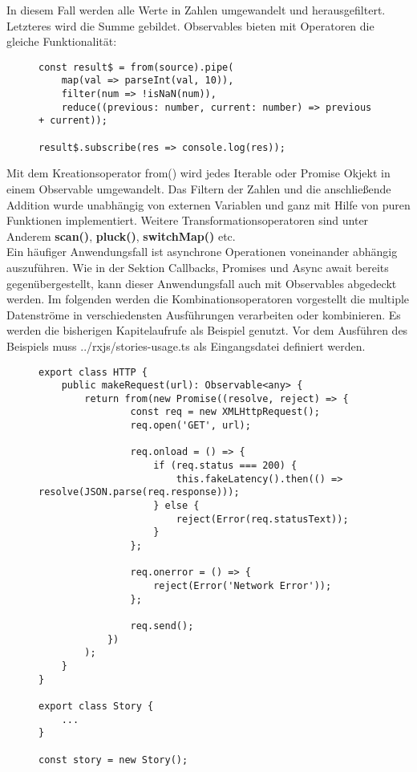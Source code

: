 \noindent
In diesem Fall werden alle Werte in Zahlen umgewandelt und herausgefiltert. Letzteres wird die Summe gebildet. Observables bieten mit Operatoren die gleiche Funktionalität:

\begin{figure}[H]
\begin{lstlisting}[basicstyle=\small]
const result$ = from(source).pipe(
    map(val => parseInt(val, 10)),
    filter(num => !isNaN(num)),
    reduce((previous: number, current: number) => previous + current));

result$.subscribe(res => console.log(res));
\end{lstlisting}
\end{figure}

\noindent
Mit dem Kreationsoperator from() wird jedes Iterable oder Promise Okjekt in einem Observable umgewandelt. Das Filtern der Zahlen und die anschließende Addition wurde unabhängig von externen Variablen und ganz mit Hilfe von puren Funktionen implementiert. Weitere Transformationsoperatoren sind unter Anderem \textbf{scan()}, \textbf{pluck()}, \textbf{switchMap()} etc.\\

\noindent
Ein häufiger Anwendungsfall ist asynchrone Operationen voneinander abhängig auszuführen. Wie in der Sektion Callbacks, Promises und Async await bereits gegenübergestellt, kann dieser Anwendungsfall auch mit Observables abgedeckt werden. Im folgenden werden die Kombinationsoperatoren vorgestellt die multiple Datenströme in verschiedensten Ausführungen verarbeiten oder kombinieren. Es werden die bisherigen Kapitelaufrufe als Beispiel genutzt. Vor dem Ausführen des Beispiels muss ../rxjs/stories-usage.ts als Eingangsdatei definiert werden.

\begin{figure}[H]
\begin{lstlisting}[basicstyle=\small]
export class HTTP {
    public makeRequest(url): Observable<any> {
        return from(new Promise((resolve, reject) => {
                const req = new XMLHttpRequest();
                req.open('GET', url);

                req.onload = () => {
                    if (req.status === 200) {
                        this.fakeLatency().then(() => resolve(JSON.parse(req.response)));
                    } else {
                        reject(Error(req.statusText));
                    }
                };

                req.onerror = () => {
                    reject(Error('Network Error'));
                };

                req.send();
            })
        );
    }
}

export class Story {
    ...
}

const story = new Story();
\end{lstlisting}
\end{figure}

